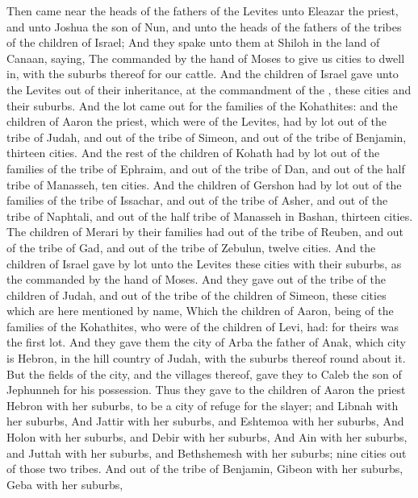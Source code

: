 \begin{biblechapter} %
 Then came near the heads of the fathers of the Levites unto Eleazar the priest, and unto Joshua the son of Nun, and unto the heads of the fathers of the tribes of the children of Israel;
\verse And they spake unto them at Shiloh in the land of Canaan, saying, The \LORD commanded by the hand of Moses to give us cities to dwell in, with the suburbs thereof for our cattle.
\verse And the children of Israel gave unto the Levites out of their inheritance, at the commandment of the \LORD, these cities and their suburbs.
\verse And the lot came out for the families of the Kohathites: and the children of Aaron the priest, which were of the Levites, had by lot out of the tribe of Judah, and out of the tribe of Simeon, and out of the tribe of Benjamin, thirteen cities.
\verse And the rest of the children of Kohath had by lot out of the families of the tribe of Ephraim, and out of the tribe of Dan, and out of the half tribe of Manasseh, ten cities.
\verse And the children of Gershon had by lot out of the families of the tribe of Issachar, and out of the tribe of Asher, and out of the tribe of Naphtali, and out of the half tribe of Manasseh in Bashan, thirteen cities.
\verse The children of Merari by their families had out of the tribe of Reuben, and out of the tribe of Gad, and out of the tribe of Zebulun, twelve cities.
\verse And the children of Israel gave by lot unto the Levites these cities with their suburbs, as the \LORD commanded by the hand of Moses.
\verse And they gave out of the tribe of the children of Judah, and out of the tribe of the children of Simeon, these cities which are here mentioned by name,
\verse Which the children of Aaron, being of the families of the Kohathites, who were of the children of Levi, had: for theirs was the first lot.
\verse And they gave them the city of Arba the father of Anak, which city is Hebron, in the hill country of Judah, with the suburbs thereof round about it.
\verse But the fields of the city, and the villages thereof, gave they to Caleb the son of Jephunneh for his possession.
\verse Thus they gave to the children of Aaron the priest Hebron with her suburbs, to be a city of refuge for the slayer; and Libnah with her suburbs,
\verse And Jattir with her suburbs, and Eshtemoa with her suburbs,
\verse And Holon with her suburbs, and Debir with her suburbs,
\verse And Ain with her suburbs, and Juttah with her suburbs, and Bethshemesh with her suburbs; nine cities out of those two tribes.
\verse And out of the tribe of Benjamin, Gibeon with her suburbs, Geba with her suburbs,

\end{biblechapter}
